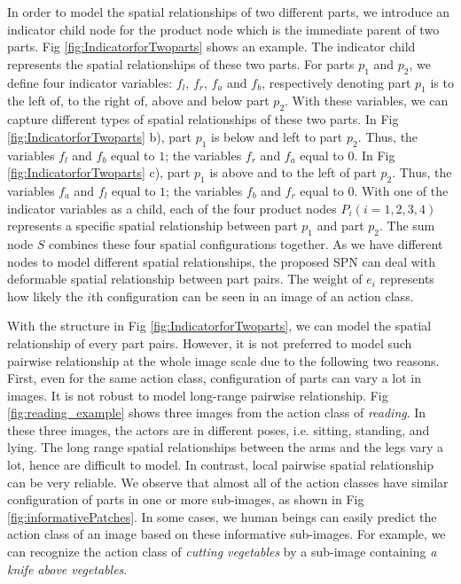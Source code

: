 \documentclass[journal]{IEEEtran}
\begin{document}
In order to model the spatial relationships of two different parts, we introduce an indicator child node for the product node which is the immediate parent of two parts. Fig \ref{fig:IndicatorforTwoparts} shows an example. The indicator child represents the spatial relationships of these two parts. For parts $ p_1 $ and $ p_2 $, we define four indicator variables: $ f_{l} $, $ f_r $, $ f_a $ and $ f_{b} $, respectively denoting part $ p_1 $ is to the left of, to the right of, above and below part $ p_2 $. With these variables, we can capture different types of spatial relationships of these two parts. In Fig \ref{fig:IndicatorforTwoparts} b), part $ p_1 $ is below and left to part $ p_2 $. Thus, the variables $ f_l $ and $ f_b $ equal to $ 1 $; the variables $ f_r $ and $ f_a $ equal to $ 0 $. In Fig \ref{fig:IndicatorforTwoparts} c), part $ p_1 $ is above and to the left of part $ p_2 $. Thus, the variables $ f_a $ and $ f_l $ equal to $ 1 $; the variables $ f_b $ and $ f_r $ equal to $ 0 $. With one of the indicator variables as a child, each of the four product nodes $ P_i(i=1,2,3,4) $ represents a specific spatial relationship between part $ p_1 $ and part $ p_2 $. The sum node $ S $ combines these four spatial configurations together. As we have different nodes to model different spatial relationships, the proposed SPN can deal with deformable spatial relationship between part pairs.
The weight of $ e_i $  represents how likely the $ i $th configuration can be seen in an image of an action class.



With the structure in Fig \ref{fig:IndicatorforTwoparts}, we can model the spatial relationship of every part pairs.
However, it is not preferred to model such pairwise relationship at the whole image scale due to the following two reasons. First, even for the same action class, configuration of parts can vary a lot in images. It is not robust to model long-range pairwise relationship. Fig \ref{fig:reading_example} shows three images from the action class of \textit{reading}. In these three images, the actors are in different poses, i.e. sitting, standing, and lying. The long range spatial relationships between the arms and the legs vary a lot, hence are difficult to model.
In contrast, local pairwise spatial relationship can be very reliable. We observe that almost all of the action classes have similar configuration of parts in one or more sub-images, as shown in Fig \ref{fig:informativePatches}.  In some cases, we human beings can easily predict the action class of an image based on these informative sub-images. For example, we can recognize the action class of
\textit{cutting vegetables} by a sub-image containing \textit{a knife above vegetables}.
\end{document}
